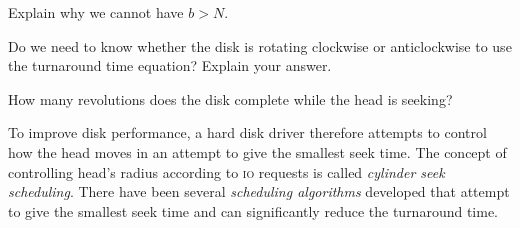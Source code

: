 \frmrule


\frmrule

\begin{example}
Explain why we cannot have $b > N$.
\end{example}

\begin{example}
Do we need to know whether the disk is rotating clockwise or anticlockwise to use 
the turnaround time equation? Explain your answer.
\end{example}

\begin{example}
How many revolutions does the disk complete while the head is seeking?
\end{example}




\frmrule


To improve disk performance, a hard disk driver therefore attempts
to control how the head moves in an attempt to give the smallest seek time. 
The concept of controlling head's radius according to \textsc{io} requests is called 
\textit{cylinder seek scheduling}. There have been several \textit{scheduling algorithms} 
developed that attempt to give the smallest seek time and can significantly reduce 
the turnaround time.  




